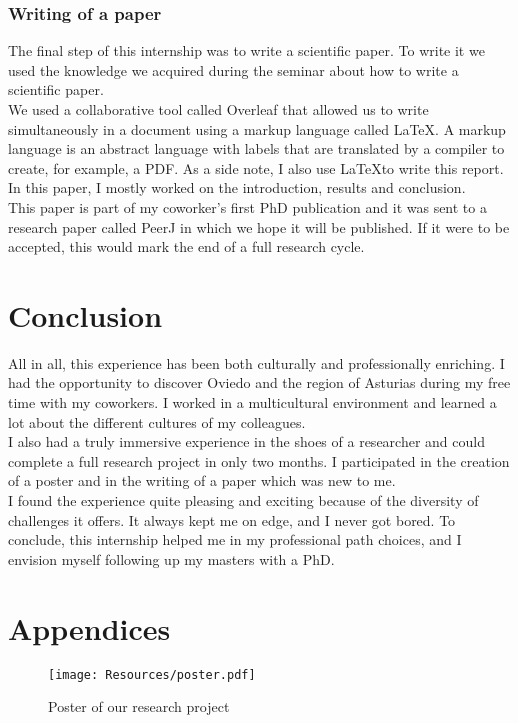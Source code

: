 \documentclass{article}
\begin{document}
\subsubsection{Writing of a paper}
The final step of this internship was to write a scientific paper.
To write it we used the knowledge we acquired during the seminar about how to write a scientific paper.
\\
We used a collaborative tool called Overleaf that allowed us to write simultaneously in a document using a markup language called \LaTeX.
A markup language is an abstract language with labels that are translated by a compiler to create, for example, a PDF.
As a side note, I also use \LaTeX to write this report.
\\
In this paper, I mostly worked on the introduction, results and conclusion.
\\
This paper is part of my coworker's first PhD publication and it was sent to a research paper called PeerJ in which we hope it will be published.
If it were to be accepted, this would mark the end of a full research cycle.


\newpage

\section{Conclusion}
All in all, this experience has been both culturally and professionally enriching.
I had the opportunity to discover Oviedo and the region of Asturias during my free time with my coworkers. I worked in a multicultural environment and learned a lot about the different cultures of my colleagues.
\\
I also had a truly immersive experience in the shoes of a researcher and could complete a full research project in only two months. I participated in the creation of a poster and in the writing of a paper which was new to me.
\\
I found the experience quite pleasing and exciting because of the diversity of challenges it offers. It always kept me on edge, and I never got bored.
To conclude, this internship helped me in my professional path choices, and I envision myself following up my masters with a PhD.

\newpage
\section{Appendices}
\begin{figure}[htpb]
    \centering
    \texttt{[image: Resources/poster.pdf]}
    \caption{Poster of our research project}
    \label{fig:tikzpgf}
\end{figure}
\end{document}
